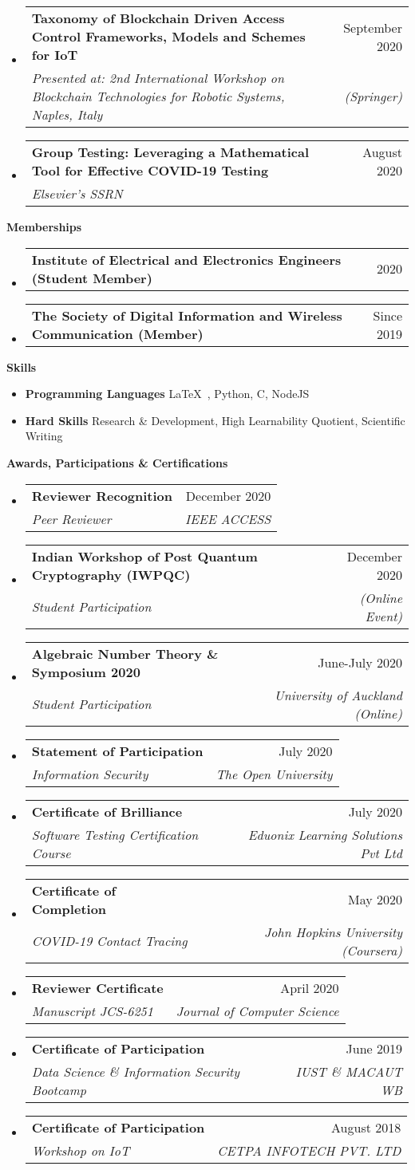 \documentclass[letterpaper,12pt]{article}[leftmargin=*]
\makeatletter
\def \entryspacing {-0pt}
\renewcommand{\section}[2]{\vspace{5pt}
  \colorbox{ternary}{\color{white}\raggedbottom\normalsize\textbf{{#1}{\hspace{7pt}#2}}}
}
\newcommand{\resumeEntryStart}{\begin{itemize}[leftmargin=2.5mm]}
\newcommand{\resumeEntryEnd}{\end{itemize}\vspace{\entryspacing}}
\newcommand{\resumeEntryTSDL}[4]{
  \vspace{-1pt}\item[]
    \begin{tabularx}{0.97\textwidth}{X@{\hspace{60pt}}r}
      \textbf{\color{primary}#1} & {\firabook\color{accent}\small#2} \\
      \textit{\color{accent}\small#3} & \textit{\color{accent}\small#4} \\
    \end{tabularx}\vspace{-6pt}
}
\newcommand{\resumeEntryTD}[2]{
  \vspace{-1pt}\item[]
    \begin{tabularx}{0.97\textwidth}{X@{\hspace{60pt}}r}
      \textbf{\color{primary}#1} & {\firabook\color{accent}\small#2} \\
    \end{tabularx}\vspace{-6pt}
}
\newcommand{\resumeEntryS}[2]{
  \item[]\small{
    \textbf{\color{primary}#1 }{ #2 \vspace{-6pt}}
  }
}
\makeatother
\begin{document}
\resumeEntryStart
    \resumeEntryTSDL
      {Taxonomy of Blockchain Driven Access Control Frameworks, Models and Schemes for IoT}{September 2020}
      {Presented at: 2nd International Workshop on Blockchain Technologies for Robotic Systems, Naples, Italy }{(Springer)}
\resumeEntryEnd
  
  \resumeEntryStart
    \resumeEntryTSDL
      {Group Testing: Leveraging a Mathematical Tool for Effective COVID-19 Testing}{August 2020}
      {Elsevier's SSRN}{}
\resumeEntryEnd


\section{\faTags}{Memberships}

  \resumeEntryStart
    \resumeEntryTD
      {Institute of Electrical and Electronics Engineers (Student Member)}{2020}
  \resumeEntryEnd

  \resumeEntryStart
    \resumeEntryTD
      {The Society of Digital Information and Wireless Communication (Member)}{Since 2019}
  \resumeEntryEnd

\section{\faGears}{Skills}
 \resumeEntryStart
  \resumeEntryS{Programming Languages } {\LaTeX\ , Python, C, NodeJS}
  \resumeEntryS{Hard Skills } {Research \& Development, High Learnability Quotient, Scientific Writing}
 \resumeEntryEnd


\section{\faCertificate}{Awards, Participations \& Certifications}
 \resumeEntryStart

\resumeEntryTSDL
      {Reviewer Recognition}{December 2020}
      {Peer Reviewer}{IEEE ACCESS} 

\resumeEntryTSDL
      {Indian Workshop of Post Quantum Cryptography (IWPQC)}{December 2020}
      {Student Participation}{(Online Event)}
\resumeEntryTSDL
      {Algebraic Number Theory \& Symposium 2020}{June-July 2020}
      {Student Participation}{University of Auckland (Online)}
\resumeEntryTSDL
      {Statement of Participation}{July 2020}
      {Information Security}{The Open University}
\resumeEntryTSDL
      {Certificate of Brilliance}{July 2020}
      {Software Testing Certification Course}{Eduonix Learning Solutions Pvt Ltd}
\resumeEntryTSDL
      {Certificate of Completion}{May 2020}
      {COVID-19 Contact Tracing}{John Hopkins University (Coursera)}
\resumeEntryTSDL
      {Reviewer Certificate}{April 2020}
      {Manuscript JCS-6251}{Journal of Computer Science}
\resumeEntryTSDL
      {Certificate of Participation}{June 2019}
      {Data Science \& Information Security Bootcamp}{IUST \& MACAUT WB}      
\resumeEntryTSDL
      {Certificate of Participation}{August 2018}
      {Workshop on IoT}{CETPA INFOTECH PVT. LTD}
      
 \resumeEntryEnd
\end{document}
